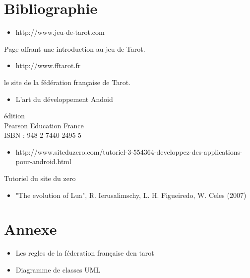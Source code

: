 \documentclass[a4paper]{report}
\begin{document}
\chapter{Bibliographie}
\begin{itemize}
\item http://www.jeu-de-tarot.com 
\end{itemize}
\indent Page offrant une introduction au jeu de Tarot.\\
\begin{itemize}
\item http://www.fftarot.fr
\end{itemize}
\indent le site de la fédération française de Tarot.\\
\begin{itemize}
\item L'art du développement Andoid
\end{itemize}
\ieme édition \\
\indent Pearson Education France\\
\indent ISBN : 948-2-7440-2495-5\\

\begin{itemize}
\item http://www.siteduzero.com/tutoriel-3-554364-developpez-des-applications-pour-android.html
\end{itemize}
\indent Tutoriel du site du zero

\begin{itemize}
\item "The evolution of Lua", R. Ierusalimschy, L. H. Figueiredo, W. Celes (2007)
\end{itemize}

\chapter{Annexe}
\begin{itemize}
\item Les regles de la féderation française den tarot
\item Diagramme de classes UML
\end{itemize}
\end{document}
